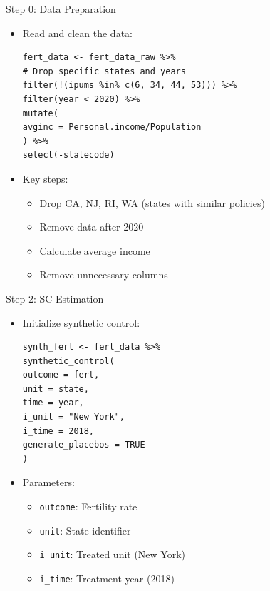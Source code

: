 \documentclass[hyperref={pdfpagelabels=false}]{beamer}
\begin{document}
\begin{frame}[fragile]{Step 0: Data Preparation}
\begin{itemize}
\item Read and clean the data:
\vspace{0.2cm}
\begin{lstlisting}
fert_data <- fert_data_raw %>%
# Drop specific states and years
filter(!(ipums %in% c(6, 34, 44, 53))) %>%  
filter(year < 2020) %>%
mutate(
avginc = Personal.income/Population
) %>%
select(-statecode)
\end{lstlisting}
\vspace{0.2cm}
\item Key steps:
\begin{itemize}
	\item Drop CA, NJ, RI, WA (states with similar policies)
	\item Remove data after 2020
	\item Calculate average income
	\item Remove unnecessary columns
\end{itemize}
\end{itemize}
\end{frame}

\begin{frame}[fragile]{Step 2: SC Estimation}
\begin{itemize}
\item Initialize synthetic control:
\vspace{0.2cm}
\begin{lstlisting}
synth_fert <- fert_data %>%
synthetic_control(
outcome = fert,
unit = state,
time = year,
i_unit = "New York",
i_time = 2018,
generate_placebos = TRUE
)
\end{lstlisting}
\vspace{0.2cm}
\item Parameters:
\begin{itemize}
\item \texttt{outcome}: Fertility rate
\item \texttt{unit}: State identifier
\item \texttt{i\_unit}: Treated unit (New York)
\item \texttt{i\_time}: Treatment year (2018)
\end{itemize}
\end{itemize}
\end{frame}
\end{document}

